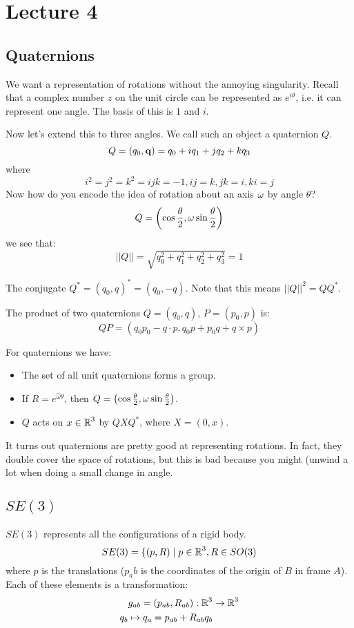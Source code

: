 \section{Lecture 4}

\subsection{Quaternions}
We want a representation of rotations without the annoying singularity.
Recall that a complex number $z$ on the unit circle can be represented
as $e^{i \theta}$, i.e. it can represent one angle. The basis of this is $1$ and $i$.

Now let's extend this to three angles. We call such an object a quaternion $Q$.
\[ Q = (q_0, \mathbf{ q }) = q_0 + i q_1 + j q_2 + k q_3 \]
where
\[ i^2 = j^2 = k^2 = ijk = -1, ij = k, jk = i, ki = j \]
Now how do you encode the idea of rotation about an axis $\mathbf{ \omega }$ by angle $\theta$?
\[ Q = \qty(\cos \frac{\theta}{2}, \mathbf{ \omega } \sin \frac{\theta}{2}) \]
we see that:
\[ ||Q|| = \sqrt{q_0^2 + q_1^2 + q_2^2 + q_3^2} = 1 \]
\begin{definition}
    The conjugate $Q^* = (q_0, q)^* = (q_0, -q)$.
    Note that this means $||Q||^2 = QQ^*$.

    The product of two quaternions $Q = (q_0, q)$, $P = (p_0, p)$ is:
    \[ QP = (q_0 p_0 - q \cdot p, q_0 p + p_0 q + q \times p) \]
\end{definition}

\begin{theorem}
    For quaternions we have:
    \begin{itemize}
        \item The set of all unit quaternions forms a group.
        \item If $R = e^{\hat{\omega} \theta}$, then $Q = \qty(\cos \frac{\theta}{2}, \omega \sin \frac{\theta}{2})$.
        \item $Q$ acts on $x \in \operatorname{\mathbb{R}}^3$ by $Q X Q^*$, where $X = (0, x)$.
    \end{itemize}
\end{theorem}

It turns out quaternions are pretty good at representing
rotations. In fact, they double cover the space of rotations,
but this is bad because you might (unwind a lot when doing a small change in angle.

\subsection{$SE(3)$}
$SE(3)$ represents all the configurations of a rigid body.
\[ SE(3) = \{ (p, R) \mid p \in \operatorname{\mathbb{R}}^3, R \in SO(3)\]
where $p$ is the translations ($p_ab$ is the coordinates of the origin of $B$ in frame $A$).
Each of these elements is a transformation:
\begin{align*}
    g_{ab} = (p_{ab}, R_{ab}): \operatorname{\mathbb{R}}^3 &\to \operatorname{\mathbb{R}}^3 \\
    q_b \mapsto q_a = p_{ab} + R_{ab} q_b
\end{align*}

